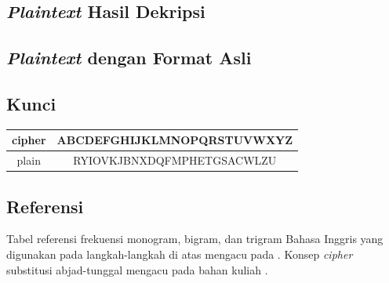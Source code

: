 

\subsection*{\textit{Plaintext} Hasil Dekripsi}


\subsection*{\textit{Plaintext} dengan Format Asli}



\subsection*{Kunci}

\begin{center}
  \begin{tabular}{|c|c|}
    \hline
    cipher & ABCDEFGHIJKLMNOPQRSTUVWXYZ \\
    \hline
    plain & RYIOVKJBNXDQFMPHETGSACWLZU \\
    \hline
  \end{tabular}
\end{center}

\subsection*{Referensi}

Tabel referensi frekuensi monogram, bigram, dan trigram Bahasa Inggris yang
digunakan pada langkah-langkah di atas mengacu pada \cite{cornell-freq,
case-ngram}. Konsep \textit{cipher} substitusi abjad-tunggal mengacu pada bahan kuliah
\cite{munir-klasik1}.
